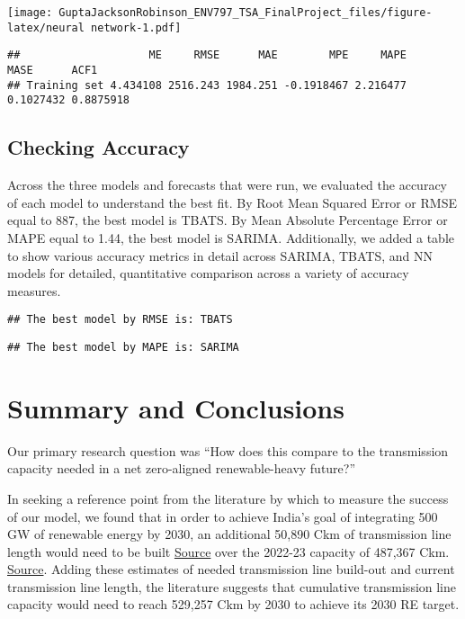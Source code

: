 \documentclass[
]{article}
\begin{document}
\texttt{[image: GuptaJacksonRobinson\_ENV797\_TSA\_FinalProject\_files/figure-latex/neural network-1.pdf]}

\begin{verbatim}
##                    ME     RMSE      MAE        MPE     MAPE      MASE      ACF1
## Training set 4.434108 2516.243 1984.251 -0.1918467 2.216477 0.1027432 0.8875918
\end{verbatim}

\hypertarget{checking-accuracy}{%
\subsection{Checking Accuracy}\label{checking-accuracy}}

Across the three models and forecasts that were run, we evaluated the
accuracy of each model to understand the best fit. By Root Mean Squared
Error or RMSE equal to 887, the best model is TBATS. By Mean Absolute
Percentage Error or MAPE equal to 1.44, the best model is SARIMA.
Additionally, we added a table to show various accuracy metrics in
detail across SARIMA, TBATS, and NN models for detailed, quantitative
comparison across a variety of accuracy measures.

\begin{verbatim}
## The best model by RMSE is: TBATS
\end{verbatim}

\begin{verbatim}
## The best model by MAPE is: SARIMA
\end{verbatim}

\hypertarget{summary-and-conclusions}{%
\section{Summary and Conclusions}\label{summary-and-conclusions}}

Our primary research question was ``How does this compare to the
transmission capacity needed in a net zero-aligned renewable-heavy
future?''

In seeking a reference point from the literature by which to measure the
success of our model, we found that in order to achieve India's goal of
integrating 500 GW of renewable energy by 2030, an additional 50,890 Ckm
of transmission line length would need to be built
\href{https://cea.nic.in/wp-content/uploads/notification/2022/12/CEA_Tx_Plan_for_500GW_Non_fossil_capacity_by_2030.pdf\#:~:text=India\%20has\%20envisaged\%20to\%20increase\%20the\%20non\%2Dfossil,energy\%20potential\%2C\%20needs\%20to\%20be\%20connected\%20to}{Source}
over the 2022-23 capacity of 487,367 Ckm.
\href{https://web.cvent.com/event/681be785-fd13-4645-8c92-3305ca1454c5/summary}{Source}.
Adding these estimates of needed transmission line build-out and current
transmission line length, the literature suggests that cumulative
transmission line capacity would need to reach 529,257 Ckm by 2030 to
achieve its 2030 RE target.
\end{document}
